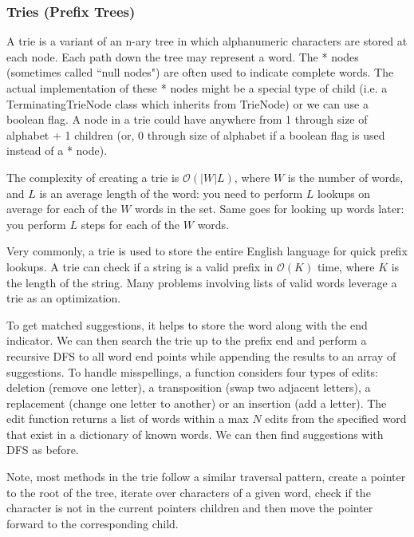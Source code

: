 \documentclass{article}
\newcommand{\bigO}{\mathcal{O}}
\begin{document}
    \subsubsection{Tries (Prefix Trees)}
    A trie is a variant of an n-ary tree in which alphanumeric characters are stored at each node. Each path down the tree may represent a word. The * nodes (sometimes called ``null nodes") are often used to indicate complete words. The actual implementation of these * nodes might be a special type of child (i.e. a TerminatingTrieNode class which inherits from TrieNode) or we can use a boolean flag. A node in a trie could have anywhere from 1 through size of alphabet + 1 children (or, 0 through size of alphabet if a boolean flag is used instead of a * node). 
    
    The complexity of creating a trie is $\bigO(|W| L)$, where $W$ is the number of words, and $L$ is an average length of the word: you need to perform $L$ lookups on average for each of the $W$ words in the set. Same goes for looking up words later: you perform $L$ steps for each of the $W$ words.
    
    Very commonly, a trie is used to store the entire English language for quick prefix lookups. A trie can check if a string is a valid prefix in $\bigO(K)$ time, where $K$ is the length of the string. Many problems involving lists of valid words leverage a trie as an optimization. 
    
    To get matched suggestions, it helps to store the word along with the end indicator. We can then search the trie up to the prefix end and perform a recursive DFS to all word end points while appending the results to an array of suggestions. To handle misspellings, a function considers four types of edits: deletion (remove one letter), a transposition (swap two adjacent letters), a replacement (change one letter to another) or an insertion (add a letter). The edit function returns a list of words within a max $N$ edits from the specified word that exist in a dictionary of known words. We can then find suggestions with DFS as before.
    
    Note, most methods in the trie follow a similar traversal pattern, create a pointer to the root of the tree, iterate over characters of a given word, check if the character is not in the current pointers children and then move the pointer forward to the corresponding child.
    
\end{document}
